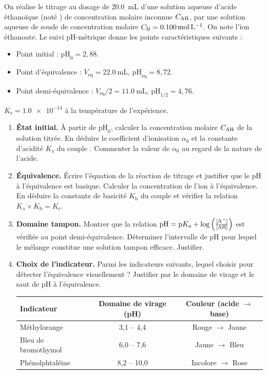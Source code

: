 \documentclass[11pt]{article}
\begin{document}
\begin{exercice}
On réalise le titrage au dosage de \SI{20,0}{\milli\liter} d'une solution aqueuse d'acide éthanoïque  (noté ) de concentration molaire inconnue $C_{\ce{AH}}$, par une solution aqueuse de soude  de concentration molaire $C_{\ce{B}} = \SI{0,100}{\mole\per\liter}$. On note  l'ion éthanoate. Le suivi pH-métrique donne les points caractéristiques suivants : 
\begin{itemize}
    \item Point initial : $\mathrm{pH}_0 = 2,88$.
    \item Point d'équivalence : $V_{\mathrm{eq}} = \SI{22,0}{\milli\liter}$, $\mathrm{pH}_{\mathrm{eq}} = 8,72$.
    \item Point demi-équivalence : $V_{\mathrm{eq}}/2 = \SI{11,0}{\milli\liter}$, $\mathrm{pH}_{1/2} = 4,76$.
\end{itemize}
$K_{\mathrm{e}} = \num{1,0e-14}$ à la température de l'expérience.

\begin{enumerate}
    \item \textbf{État initial.} À partir de $\mathrm{pH}_0$, calculer la concentration molaire $C_{\ce{AH}}$ de la solution titrée. En déduire le coefficient d'ionisation $\alpha_0$ et la constante d'acidité $K_{\mathrm{a}}$ du couple . Commenter la valeur de $\alpha_0$ au regard de la nature de l'acide.
    \item \textbf{Équivalence.} Écrire l'équation de la réaction de titrage et justifier que le pH à l'équivalence est basique. Calculer la concentration de l'ion  à l'équivalence. En déduire la constante de basicité $K_{\mathrm{b}}$ du couple  et vérifier la relation $K_{\mathrm{a}} \times K_{\mathrm{b}} = K_{\mathrm{e}}$.
    \item \textbf{Domaine tampon.} Montrer que la relation $\mathrm{pH} = \mathrm{p}K_{\mathrm{a}} + \log\left(\frac{[\ce{A-}]}{[\ce{AH}]}\right)$ est vérifiée au point demi-équivalence. Déterminer l'intervalle de pH pour lequel le mélange  constitue une solution tampon efficace. Justifier.
    \item \textbf{Choix de l'indicateur.} Parmi les indicateurs suivants, lequel choisir pour détecter l'équivalence visuellement ? Justifier par le domaine de virage et le saut de pH à l'équivalence.
    \begin{center}
    \begin{tabular}{lcc}
    \hline
    Indicateur & Domaine de virage (pH) & Couleur (acide $\to$ base) \\
    \hline
    Méthylorange & 3,1 -- 4,4 & Rouge $\to$ Jaune \\
    Bleu de bromothymol & 6,0 -- 7,6 & Jaune $\to$ Bleu \\
    Phénolphtaléine & 8,2 -- 10,0 & Incolore $\to$ Rose \\
    \hline
    \end{tabular}
    \end{center}
\end{enumerate}
\end{exercice}
\end{document}
